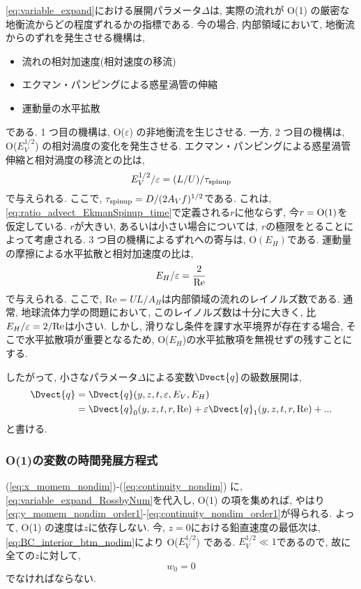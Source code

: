 \eqref{eq:variable_expand}における展開パラメータ$\Delta$は, 
実際の流れが O(1) の厳密な地衡流からどの程度ずれるかの指標である. 
今の場合, 内部領域において, 地衡流からのずれを発生させる機構は, 
\begin{itemize}
 \item 流れの相対加速度(相対速度の移流)
 \item エクマン・パンピングによる惑星渦管の伸縮  
 \item 運動量の水平拡散
\end{itemize}
である. 
1 つ目の機構は, O($\varepsilon$) の非地衡流を生じさせる. 
一方, 2 つ目の機構は, O($E_V^{1/2}$) の相対渦度の変化を発生させる. 
エクマン・パンピングによる惑星渦管伸縮と相対渦度の移流との比は,
$$
E_V^{1/2}/\varepsilon = (L/U)/\tau_{\rm spinup}
$$
で与えられる. 
ここで, $\tau_{\rm spinup}=D/(2A_V f)^{1/2}$である. 
これは, \eqref{eq:ratio_advect_EkmanSpinup_time}で定義される$r$に他ならず,  
今$r={\rm O}(1)$を仮定している. 
$r$が大きい, あるいは小さい場合については, $r$の極限をとることによって考慮される. 
3 つ目の機構によるずれへの寄与は, O$(E_H)$である. 
運動量の摩擦による水平拡散と相対加速度の比は, 
$$
 E_H/\varepsilon = \dfrac{2}{\rm Re}
$$
で与えられる. 
ここで, Re$=UL/A_H$は内部領域の流れのレイノルズ数である. 
通常, 地球流体力学の問題において, このレイノルズ数は十分に大きく, 
比$E_H/\varepsilon=2/{\rm Re}$は小さい. 
しかし, 滑りなし条件を課す水平境界が存在する場合, そこで水平拡散項が重要となるため, 
O($E_H$)の水平拡散項を無視せずの残すことにする. 

したがって, 小さなパラメータ$\Delta$による変数$\Dvect{q}$の級数展開は, 
\begin{equation}
\begin{split}
   \Dvect{q} &= \Dvect{q}(y,z,t, \varepsilon, E_V, E_H) \\
             &= \Dvect{q}_0(y,z,t, r, {\rm Re})
                 + \varepsilon \Dvect{q}_1(y,z,t, r, {\rm Re}) + ...
\label{eq:variable_expand_RossbyNum}
\end{split}
\end{equation}
と書ける. 

\subsubsection*{O(1)の変数の時間発展方程式}

(\ref{eq:x_momem_nondim})-(\ref{eq:continuity_nondim}) に, 
\eqref{eq:variable_expand_RossbyNum}を代入し, O(1) の項を集めれば, 
やはり\eqref{eq:y_momem_nondim_order1}-\eqref{eq:continuity_nondim_order1}が得られる. 
よって, O(1) の速度は$z$に依存しない. 
今, $z=0$における鉛直速度の最低次は, \eqref{eq:BC_interior_btm_nodim}により O($E_V^{1/2}$) である. 
$E_V^{1/2} \ll 1$であるので, 故に全ての$z$に対して, 
\begin{equation}
\boxed{
  w_0 = 0
}
\label{eq:interior_wvel_order1}
\end{equation}
でなければならない. 

